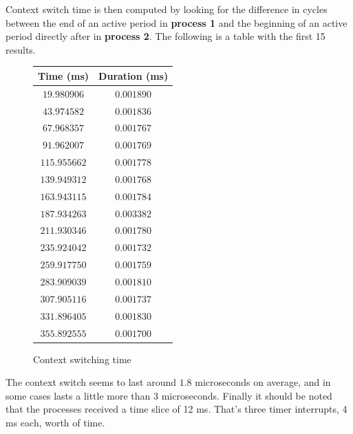 \documentclass[oneside]{amsart}
\theoremstyle{definition}
\theoremstyle{remark}
\numberwithin{equation}{section}
\begin{document}
Context switch time is then computed by looking for the difference in cycles between the end of an
active period in \textbf{process 1} and the beginning of an active period directly after in
\textbf{process 2}. The following is a table with the first 15 results.

\begin{figure}[h]
    \caption{Context switching time}
    \begin{tabular}{c|c}
        \rowcolor{gray!50}
        Time (ms) & Duration (ms) \\
        \hline
        $19.980906 $ & $0.001890$ \\
        $43.974582 $ & $0.001836$ \\
        $67.968357 $ & $0.001767$ \\
        $91.962007 $ & $0.001769$ \\
        $115.955662$ & $0.001778$ \\
        $139.949312$ & $0.001768$ \\
        $163.943115$ & $0.001784$ \\
        $187.934263$ & $0.003382$ \\
        $211.930346$ & $0.001780$ \\
        $235.924042$ & $0.001732$ \\
        $259.917750$ & $0.001759$ \\
        $283.909039$ & $0.001810$ \\
        $307.905116$ & $0.001737$ \\
        $331.896405$ & $0.001830$ \\
        $355.892555$ & $0.001700$
    \end{tabular}
\end{figure}

The context switch seems to last around $1.8$ microseconds on average, and in some cases lasts
a little more than $3$ microseconds. Finally it should be noted that the processes received a time
slice of 12 ms. That's three timer interrupts, 4 ms each, worth of time.

\end{document}
